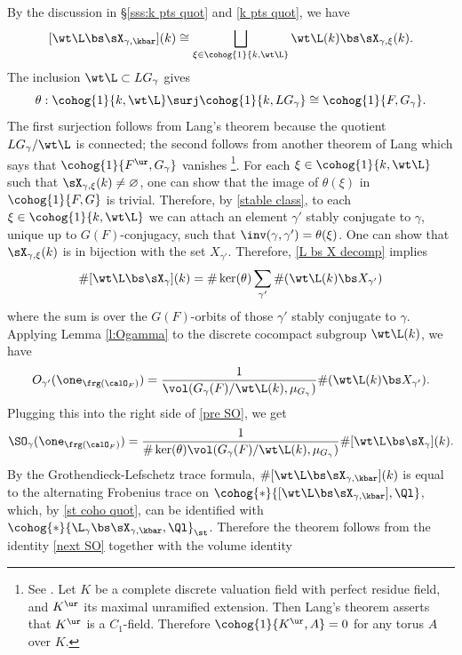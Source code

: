 By the discussion in \S\ref{sss:k pts quot} and \eqref{k pts quot}, we have
\begin{equation}\label{L bs X decomp}
[\wt\L\bs\sX_{\gamma,\kbar}](k)\cong\bigsqcup_{\xi\in\cohog{1}{k,\wt\L}} \wt\L(k)\bs\sX_{\gamma,\xi}(k).
\end{equation}
The inclusion $\wt\L\subset LG_{\gamma}$ gives
\begin{equation*}
\theta: \cohog{1}{k,\wt\L}\surj\cohog{1}{k,LG_{\gamma}}\cong\cohog{1}{F, G_{\gamma}}.
\end{equation*}
The first surjection follows from Lang's theorem because the quotient $LG_{\gamma}/\wt\L$ is connected; the second follows from another theorem of Lang which says that $\cohog{1}{F^{\ur}, G_{\gamma}}$ vanishes
\footnote{See \cite[Ch.X, \S7, p.170, Application and Example (b)]{Serre}. Let $K$ be a complete discrete valuation field with perfect residue field, and $K^{\ur}$ its maximal unramified extension. Then Lang's theorem asserts that $K^{\ur}$ is a $C_{1}$-field. Therefore $\cohog{1}{K^{\ur}, A}=0$ for any torus $A$ over $K$.}. For each $\xi\in\cohog{1}{k,\wt\L}$ such that $\sX_{\gamma,\xi}(k)\neq\varnothing$, one can show that the image of $\theta(\xi)$ in $\cohog{1}{F,G}$ is trivial. Therefore, by \eqref{stable class}, to each $\xi\in\cohog{1}{k,\wt\L}$ we can attach an element $\gamma'$ stably conjugate to $\gamma$, unique up to $G(F)$-conjugacy, such that $\inv(\gamma,\gamma')=\theta(\xi)$. One can show that $\sX_{\gamma,\xi}(k)$ is in bijection with the set $X_{\gamma'}$. Therefore,  \eqref{L bs X decomp} implies
\begin{equation}\label{pre SO}
\#[\wt\L\bs\sX_{\gamma}](k)=\#\ker(\theta)\sum_{\gamma'}\#(\wt\L(k)\bs X_{\gamma'})
\end{equation}
where the sum is over the $G(F)$-orbits of those $\gamma'$ stably conjugate to $\gamma$. Applying Lemma \ref{l:Ogamma} to the discrete cocompact subgroup $\wt\L(k)$, we have
\begin{equation*}
O_{\gamma'}(\one_{\frg(\calO_{F})})=\frac{1}{\vol(G_{\gamma}(F)/\wt\L(k),\mu_{G_{\gamma}})}\#(\wt\L(k)\bs X_{\gamma'}).
\end{equation*}
Plugging this into the right side of \eqref{pre SO}, we get
\begin{equation}\label{next SO}
\SO_{\gamma}(\one_{\frg(\calO_{F})})=\frac{1}{\#\ker(\theta)\vol(G_{\gamma}(F)/\wt\L(k),\mu_{G_{\gamma}})}\#[\wt\L\bs\sX_{\gamma}](k).
\end{equation} 
By the Grothendieck-Lefschetz trace formula,   $\#[\wt\L\bs\sX_{\gamma,\kbar}](k)$ is equal to the alternating Frobenius trace on $\cohog{*}{[\wt\L\bs\sX_{\gamma,\kbar}],\Ql}$, which, by \eqref{st coho quot}, can be identified with $\cohog{*}{\L_{\gamma}\bs\sX_{\gamma,\kbar},\Ql}_{\st}$. Therefore the theorem follows from the identity \eqref{next SO} together with the volume identity
